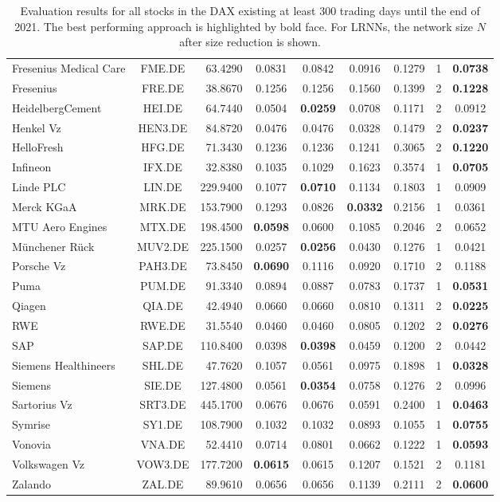 \documentclass[twoside,11pt]{article}
\theoremstyle{definition}
\begin{document}
\begin{table}
\begin{tabular}{l@{ }crcccccc}
Fresenius Medical Care & FME.DE & 63.4290 & 0.0831 & 0.0842 & 0.0916 & 0.1279 & 1 & \textbf{0.0738}\\
Fresenius & FRE.DE & 38.8670 & 0.1256 & 0.1256 & 0.1560 & 0.1399 & 2 & \textbf{0.1228}\\
HeidelbergCement & HEI.DE & 64.7440 & 0.0504 & \textbf{0.0259} & 0.0708 & 0.1171 & 2 & 0.0912\\
Henkel Vz & HEN3.DE & 84.8720 & 0.0476 & 0.0476 & 0.0328 & 0.1479 & 2 & \textbf{0.0237}\\
HelloFresh & HFG.DE & 71.3430 & 0.1236 & 0.1236 & 0.1241 & 0.3065 & 2 & \textbf{0.1220}\\
Infineon & IFX.DE & 32.8380 & 0.1035 & 0.1029 & 0.1623 & 0.3574 & 1 & \textbf{0.0705}\\
Linde PLC & LIN.DE & 229.9400 & 0.1077 & \textbf{0.0710} & 0.1134 & 0.1803 & 1 & 0.0909\\
Merck KGaA & MRK.DE & 153.7900 & 0.1293 & 0.0826 & \textbf{0.0332} & 0.2156 & 1 & 0.0361\\
MTU Aero Engines & MTX.DE & 198.4500 & \textbf{0.0598} & 0.0600 & 0.1085 & 0.2046 & 2 & 0.0652\\
Münchener Rück & MUV2.DE & 225.1500 & 0.0257 & \textbf{0.0256} & 0.0430 & 0.1276 & 1 & 0.0421\\
Porsche Vz & PAH3.DE & 73.8450 & \textbf{0.0690} & 0.1116 & 0.0920 & 0.1710 & 2 & 0.1188\\
Puma & PUM.DE & 91.3340 & 0.0894 & 0.0887 & 0.0783 & 0.1737 & 1 & \textbf{0.0531}\\
Qiagen & QIA.DE & 42.4940 & 0.0660 & 0.0660 & 0.0810 & 0.1311 & 2 & \textbf{0.0225}\\
RWE & RWE.DE & 31.5540 & 0.0460 & 0.0460 & 0.0805 & 0.1202 & 2 & \textbf{0.0276}\\
SAP & SAP.DE & 110.8400 & 0.0398 & \textbf{0.0398} & 0.0459 & 0.1200 & 2 & 0.0442\\
Siemens Healthineers & SHL.DE & 47.7620 & 0.1057 & 0.0561 & 0.0975 & 0.1898 & 1 & \textbf{0.0328}\\
Siemens & SIE.DE & 127.4800 & 0.0561 & \textbf{0.0354} & 0.0758 & 0.1276 & 2 & 0.0996\\
Sartorius Vz & SRT3.DE & 445.1700 & 0.0676 & 0.0676 & 0.0591 & 0.2400 & 1 & \textbf{0.0463}\\
Symrise & SY1.DE & 108.7900 & 0.1032 & 0.1032 & 0.0893 & 0.1055 & 1 & \textbf{0.0755}\\
Vonovia & VNA.DE & 52.4410 & 0.0714 & 0.0801 & 0.0662 & 0.1222 & 1 & \textbf{0.0593}\\
Volkswagen Vz & VOW3.DE & 177.7200 & \textbf{0.0615} & 0.0615 & 0.1207 & 0.1521 & 2 & 0.1181\\
Zalando & ZAL.DE & 89.9610 & 0.0656 & 0.0656 & 0.1139 & 0.2111 & 2 & \textbf{0.0600}\\
\bottomrule
\end{tabular}
\caption{Evaluation results for all stocks in the DAX existing at least 300
trading days until the end of 2021. The best performing
approach is highlighted by bold face. For LRNNs, the network size $N$ after size
reduction is shown.}
\label{dax}
\end{table}
\end{document}
